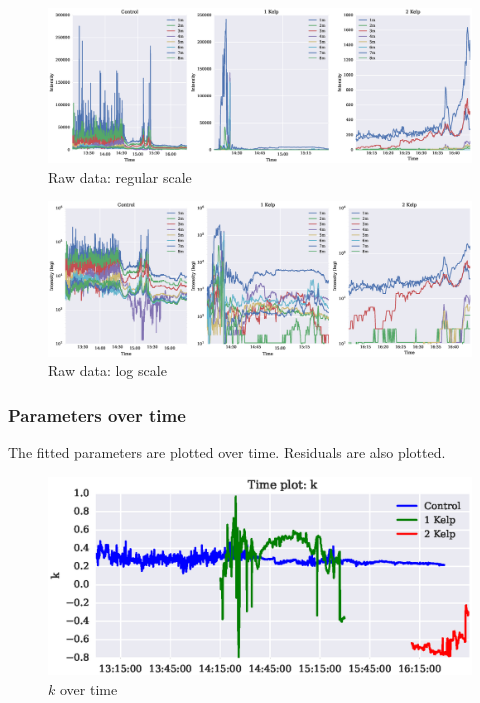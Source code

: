 \documentclass{article}
\newcommand\plotwidth{7in}
\begin{document}
\begin{figure}[H]
	\centering
	\includegraphics[width=\textwidth]{plots/light_data.eps}
	\caption{Raw data: regular scale}
\end{figure}

\begin{figure}[H]
	\centering
	\includegraphics[width=\textwidth]{plots/light_data_log.eps}
	\caption{Raw data: log scale}
\end{figure}

\pagebreak
\subsubsection{Parameters over time}
The fitted parameters are plotted over time. Residuals are also plotted.

\begin{figure}[H]
	\centering
	\includegraphics[width=\plotwidth]{plots/time_k.eps}
	\caption{$k$ over time}
	\label{time_k}
\end{figure}
\end{document}
